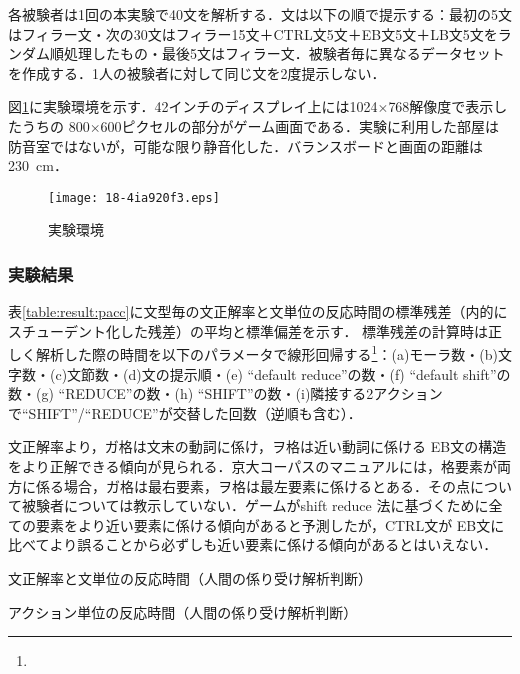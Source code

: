 \documentclass[japanese]{jnlp_1.4}
\def\modified#1{}
\begin{document}
各被験者は1回の本実験で40文を解析する．文は以下の順で提示する：最初の5文はフィラー文・次の30文はフィラー15文＋CTRL文5文＋EB文5文＋LB文5文をランダム順処理したもの・最後5文はフィラー文．被験者毎に異なるデータセットを作成する．1人の被験者に対して同じ文を2度提示しない．

図\ref{fig:room}に実験環境を示す．42インチのディスプレイ上には1024$\times$768解像度で表示したうちの 800$\times$600ピクセルの部分がゲーム画面である．実験に利用した部屋は防音室ではないが，可能な限り静音化した．バランスボードと画面の距離は230~cm．\modified{図中ホワイトボードの後ろに教示者がおり，練習時には操作方法の指示を行う．}

\begin{figure}[t]
\begin{center}
\texttt{[image: 18-4ia920f3.eps]}
\end{center}
\caption{実験環境}
 \label{fig:room}
\end{figure}



\subsubsection{実験結果}

表\ref{table:result:pacc}に文型毎の文正解率と文単位の反応時間の標準残差（内的にスチューデント化した残差）の平均と標準偏差を示す．
標準残差の計算時は正しく解析した際の時間を以下のパラメータで線形回帰する\footnote{\modified{線形回帰は文の処理時間を正規化するために行う．回帰による予測値と実測値の乖離を検討し，所要時間の文型間の差異を評価する．}}：(a)モーラ数・(b)文字数・(c)文節数・(d)文の提示順・(e) ``default reduce''の数・(f) ``default shift''の数・(g) ``REDUCE''の数・(h) ``SHIFT''の数・(i)隣接する2アクションで``SHIFT''/``REDUCE''が交替した回数（逆順も含む）．

文正解率より，ガ格は文末の動詞に係け，ヲ格は近い動詞に係ける EB文の構造をより正解できる傾向が見られる．京大コーパスのマニュアルには，格要素が両方に係る場合，ガ格は最右要素，ヲ格は最左要素に係けるとある．その点について被験者については教示していない．ゲームがshift reduce 法に基づくために全ての要素をより近い要素に係ける傾向があると予測したが，CTRL文が EB文に比べてより誤ることから必ずしも近い要素に係ける傾向があるとはいえない．

\begin{table}[b]
\caption{文正解率と文単位の反応時間（人間の係り受け解析判断）}
\label{table:result:pacc}

\end{table}
\begin{table}[b]
\caption{アクション単位の反応時間（人間の係り受け解析判断）}
\label{table:result:ptime}

\end{table}
\end{document}
